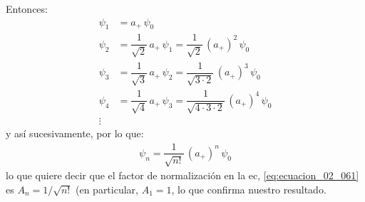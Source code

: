 Entonces:
\begin{align*}
\psi_{1} &= a_{+} \, \psi_{0} \\[0.5em]
\psi_{2} &= \dfrac{1}{\sqrt{2}} \, a_{+} \, \psi_{1} = \dfrac{1}{\sqrt{2}} \, (a_{+})^{2} \, \psi_{0} \\[0.5em]
\psi_{3} &= \dfrac{1}{\sqrt{3}} \, a_{+} \, \psi_{2} = \dfrac{1}{\sqrt{3 \cdot 2}} \, (a_{+})^{3} \, \psi_{0} \\[0.5em]
\psi_{4} &= \dfrac{1}{\sqrt{4}} \, a_{+} \, \psi_{3} = \dfrac{1}{\sqrt{4 \cdot 3 \cdot 2}} \, (a_{+})^{4} \, \psi_{0} \\[0.5em]
\vdots
\end{align*}
y así sucesivamente, por lo que:
\begin{align}
\psi_{n} = \dfrac{1}{\sqrt{n!}} \, (a_{+})^{n} \, \psi_{0}
\label{eq:ecuacion_02_067}
\end{align}
lo que quiere decir que el factor de normalización en la ec, \ref{eq:ecuacion_02_061} es $A_{n} = 1 / \sqrt{n!}$  (en particular, $A_{1} = 1$, lo que confirma nuestro resultado.

